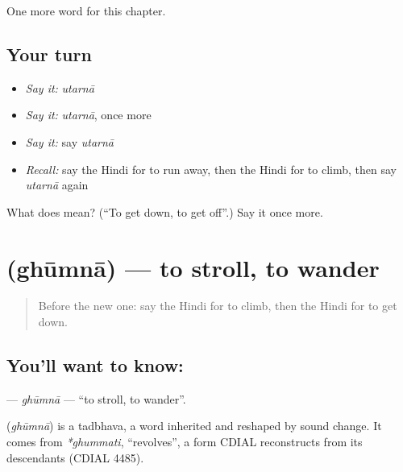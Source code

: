 \begin{grammarlens}[title={What you've built}]
One more word for this chapter.
\end{grammarlens}

\subsection*{Your turn}
\begin{itemize}
\raggedright
  \item \emph{Say it:} \emph{utarnā}
  \item \emph{Say it:} \emph{utarnā}, once more
  \item \emph{Say it:} say \emph{utarnā}
  \item \emph{Recall:} say the Hindi for to run away, then the Hindi for to climb, then say \emph{utarnā} again
\end{itemize}

\begin{tcolorbox}[breakable,colback=teal!4,colframe=teal!35!black,title={Before you move on}]
What does  mean? (\textquotedblleft{}To get down, to get off\textquotedblright{}.) Say it once more.
\end{tcolorbox}
\section[\texorpdfstring{\hi{घूमना} (ghūmnā)}{घूमना (ghūmnā)}]{ (ghūmnā) — to stroll, to wander}

\label{lesson:HI-C172-ghumna}



\begin{quote}
Before the new one: say the Hindi for to climb, then the Hindi for to get down.
\end{quote}

\subsection*{You'll want to know: }
\textbf{} — \emph{ghūmnā} — \textquotedblleft{}to stroll, to wander\textquotedblright{}.

\begin{cousinweb}
\textbf{} (\emph{ghūmnā}) is a tadbhava, a word inherited and reshaped by sound change. It comes from \emph{*ghummati}, \textquotedblleft{}revolves\textquotedblright{}, a form CDIAL reconstructs from its descendants (CDIAL 4485).
\end{cousinweb}

